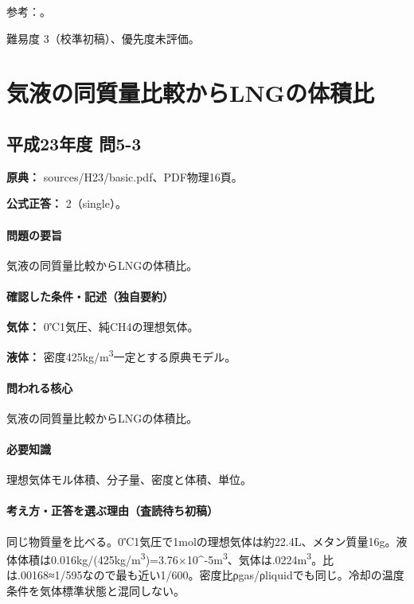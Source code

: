 \par 参考：\cite{env59_ndc,env58_pmstandard}。

\par 難易度 3（校準初稿）、優先度未評価。

\section{気液の同質量比較からLNGの体積比}

\subsection{平成23年度 問5-3}
\label{q:h23-reg-basic-5-3}

\noindent\textbf{原典：} sources/H23/basic.pdf、PDF物理16頁。

\textbf{公式正答：} 2（single）。

\paragraph{問題の要旨} 気液の同質量比較からLNGの体積比。

\paragraph{確認した条件・記述（独自要約）}\mbox{}\par

\noindent\textbf{気体：} 0℃1気圧、純CH4の理想気体。\par

\noindent\textbf{液体：} 密度425kg/m\textsuperscript{3}一定とする原典モデル。\par

\paragraph{問われる核心} 気液の同質量比較からLNGの体積比。

\paragraph{必要知識} 理想気体モル体積、分子量、密度と体積、単位。

\paragraph{考え方・正答を選ぶ理由（査読待ち初稿）} 同じ物質量を比べる。0℃1気圧で1molの理想気体は約22.4L、メタン質量16g。液体体積は0.016kg/(425kg/m\textsuperscript{3})=\allowbreak{}3.76×10\textasciicircum{}-5m\textsuperscript{3}、気体は.0224m\textsuperscript{3}。比は.00168≈1/595なので最も近い1/600。密度比ρgas/ρliquidでも同じ。冷却の温度条件を気体標準状態と混同しない。

